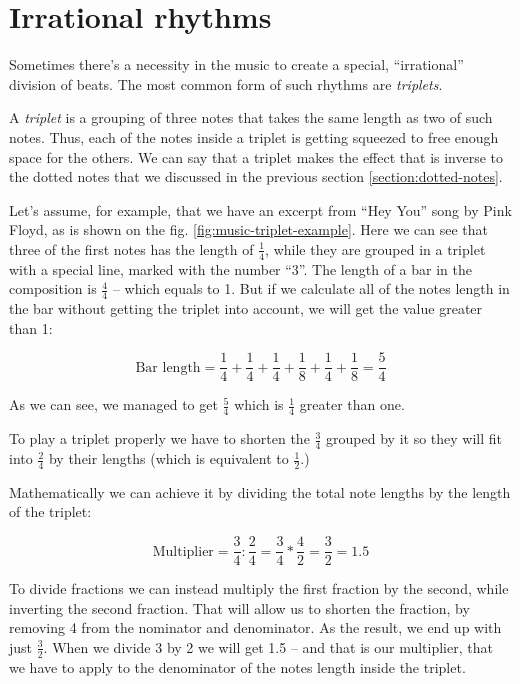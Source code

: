 \documentclass[../sparc.tex]{subfiles}
\begin{document}
\section{Irrational rhythms}

Sometimes there's a necessity in the music to create a special, ``irrational''
division of beats.  The most common form of such rhythms are \emph{triplets}.

A \emph{triplet} is a grouping of three notes that takes the same length as two
of such notes.  Thus, each of the notes inside a triplet is getting squeezed to
free enough space for the others.  We can say that a triplet makes the effect
that is inverse to the dotted notes that we discussed in the previous section
\ref{section:dotted-notes}.


Let's assume, for example, that we have an excerpt from ``Hey You'' song by Pink
Floyd, as is shown on the fig. \ref{fig:music-triplet-example}.  Here we can see
that three of the first notes has the length of $\frac{1}{4}$, while they are
grouped in a triplet with a special line, marked with the number ``3''.  The
length of a bar in the composition is $\frac{4}{4}$ -- which equals to 1.  But if
we calculate all of the notes length in the bar without getting the triplet into
account, we will get the value greater than 1:

\begin{equation}
  \mbox{Bar length} = \frac{1}{4} + \frac{1}{4}
  + \frac{1}{4} + \frac{1}{8} + \frac{1}{4} + \frac{1}{8} = \frac{5}{4}
\end{equation}

As we can see, we managed to get $\frac{5}{4}$ which is $\frac{1}{4}$ greater
than one.

To play a triplet properly we have to shorten the $\frac{3}{4}$ grouped by it so
they will fit into $\frac{2}{4}$ by their lengths (which is equivalent to
$\frac{1}{2}$.)

Mathematically we can achieve it by dividing the total note lengths by the
length of the triplet:

\begin{equation}
  \mbox{Multiplier} = \frac{3}{4} : \frac{2}{4} = \frac{3}{4} * \frac{4}{2}
  = \frac{3}{2} = 1.5
\end{equation}

To divide fractions we can instead multiply the first fraction by the second,
while inverting the second fraction.  That will allow us to shorten the
fraction, by removing 4 from the nominator and denominator.  As the result, we
end up with just $\frac{3}{2}$.  When we divide 3 by 2 we will get 1.5 -- and
that is our multiplier, that we have to apply to the denominator of the notes
length inside the triplet.
\end{document}
